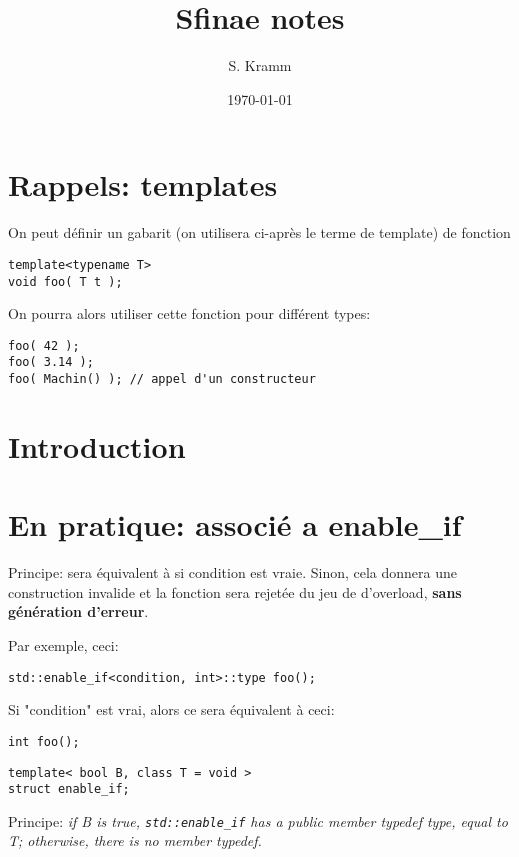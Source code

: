 \documentclass[11pt,a4paper]{article}
\author{S. Kramm}
\title{Sfinae notes}
\date{\today}
\begin{document}
\maketitle


\section{Rappels: templates}

On peut définir un gabarit (on utilisera ci-après le terme de template) de fonction

\begin{lstlisting}
template<typename T>
void foo( T t );
\end{lstlisting}

On pourra alors utiliser cette fonction pour différent types:
\begin{lstlisting}
foo( 42 );
foo( 3.14 );
foo( Machin() ); // appel d'un constructeur
\end{lstlisting}





\section{Introduction}



\section{En pratique: associé a enable\_if}

Principe:  sera équivalent à  si condition est vraie.
Sinon, cela donnera une construction invalide et la fonction sera rejetée du jeu de d'overload, {\bf sans génération d'erreur}.

Par exemple, ceci:
\begin{lstlisting}
std::enable_if<condition, int>::type foo();
\end{lstlisting}
Si "condition" est vrai, alors ce sera équivalent à ceci:
\begin{lstlisting}
int foo();
\end{lstlisting}


\begin{lstlisting}
template< bool B, class T = void >
struct enable_if;
\end{lstlisting}

Principe:
{\em if B is true, {\tt std::enable\_if} has a public member typedef type, equal to T; otherwise, there is no member typedef. }
\end{document}
